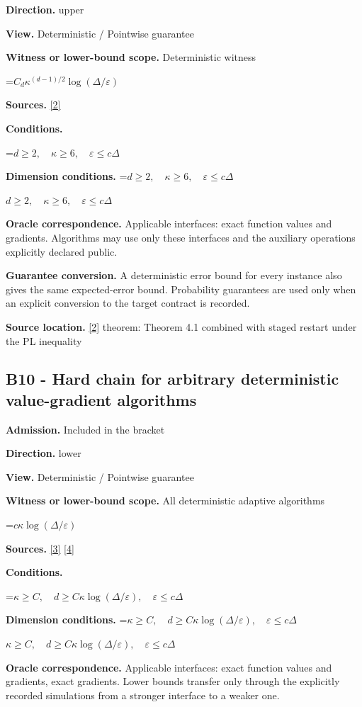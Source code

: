 \documentclass[10pt,a4paper]{article}
\newcommand{\AtlasMath}[1]{\par\begingroup\centering\setbox0=\hbox{$\displaystyle #1$}\ifdim\wd0>1.4\linewidth\typeout{ATLAS WIDE FORMULA: \the\wd0}\fi\ifdim\wd0>\linewidth\resizebox{\linewidth}{!}{\box0}\else\box0\fi\par\endgroup}
\newcommand{\AtlasInlineMath}[1]{\begingroup\setbox0=\hbox{$#1$}\ifdim\wd0>.4\linewidth\endgroup\AtlasMath{#1}\else\endgroup$#1$\fi}
\begin{document}
\textbf{Direction.} upper

\textbf{View.} Deterministic / Pointwise guarantee

\textbf{Witness or lower-bound scope.} Deterministic witness

\AtlasMath{C_d\kappa^{(d-1)/2}\log(\Delta/\varepsilon)}
\textbf{Sources.} \href{https://arxiv.org/pdf/2310.09157}{[2]}

\textbf{Conditions.} 
\AtlasMath{d\ge2,\quad\kappa\ge6,\quad\varepsilon\le c\Delta}


\textbf{Dimension conditions.} \AtlasInlineMath{d\ge2,\quad\kappa\ge6,\quad\varepsilon\le c\Delta}

\textbf{Oracle correspondence.} Applicable interfaces: exact function values and gradients. Algorithms may use only these interfaces and the auxiliary operations explicitly declared public.

\textbf{Guarantee conversion.} A deterministic error bound for every instance also gives the same expected-error bound. Probability guarantees are used only when an explicit conversion to the target contract is recorded.

\textbf{Source location.} \href{https://arxiv.org/pdf/2310.09157}{[2]} theorem: Theorem 4.1 combined with staged restart under the PL inequality

\subsection{B10 - Hard chain for arbitrary deterministic value-gradient algorithms}
\textbf{Admission.} Included in the bracket

\textbf{Direction.} lower

\textbf{View.} Deterministic / Pointwise guarantee

\textbf{Witness or lower-bound scope.} All deterministic adaptive algorithms

\AtlasMath{c\kappa\log(\Delta/\varepsilon)}
\textbf{Sources.} \href{https://arxiv.org/pdf/2212.13551}{[3]} \href{https://arxiv.org/pdf/1710.11606}{[4]}

\textbf{Conditions.} 
\AtlasMath{\kappa\ge C,\quad d\ge C\kappa\log(\Delta/\varepsilon),\quad\varepsilon\le c\Delta}


\textbf{Dimension conditions.} \AtlasInlineMath{\kappa\ge C,\quad d\ge C\kappa\log(\Delta/\varepsilon),\quad\varepsilon\le c\Delta}

\textbf{Oracle correspondence.} Applicable interfaces: exact function values and gradients, exact gradients. Lower bounds transfer only through the explicitly recorded simulations from a stronger interface to a weaker one.
\end{document}
